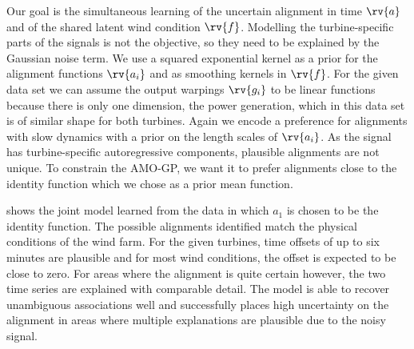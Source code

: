 \documentclass{article}
\begin{document}
Our goal is the simultaneous learning of the uncertain alignment in time $\rv{a}$ and of the shared latent wind condition $\rv{f}$.
Modelling the turbine-specific parts of the signals is not the objective, so they need to be explained by the Gaussian noise term.
We use a squared exponential kernel as a prior for the alignment functions $\rv{a_i}$ and as smoothing kernels in $\rv{f}$.
For the given data set we can assume the output warpings $\rv{g_i}$ to be linear functions because there is only one dimension, the power generation, which in this data set is of similar shape for both turbines.
Again we encode a preference for alignments with slow dynamics with a prior on the length scales of $\rv{a_i}$.
As the signal has turbine-specific autoregressive components, plausible alignments are not unique.
To constrain the AMO-GP, we want it to prefer alignments close to the identity function which we chose as a prior mean function.


 shows the joint model learned from the data in which $a_1$ is chosen to be the identity function.
The possible alignments identified match the physical conditions of the wind farm.
For the given turbines, time offsets of up to six minutes are plausible and for most wind conditions, the offset is expected to be close to zero.
For areas where the alignment is quite certain however, the two time series are explained with comparable detail.
The model is able to recover unambiguous associations well and successfully places high uncertainty on the alignment in areas where multiple explanations are plausible due to the noisy signal.
\end{document}
